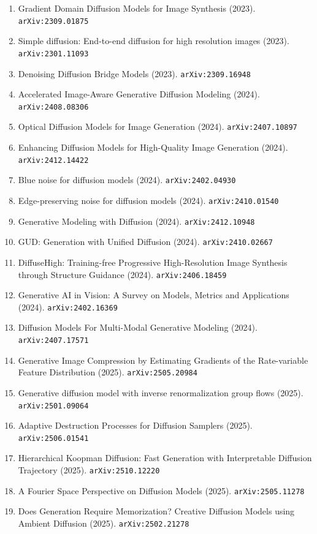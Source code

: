 \documentclass[11pt]{article}
\begin{document}
\begin{enumerate}
  \item Gradient Domain Diffusion Models for Image Synthesis (2023). \texttt{arXiv:2309.01875}
  \item Simple diffusion: End-to-end diffusion for high resolution images (2023). \texttt{arXiv:2301.11093}
  \item Denoising Diffusion Bridge Models (2023). \texttt{arXiv:2309.16948}
  \item Accelerated Image-Aware Generative Diffusion Modeling (2024). \texttt{arXiv:2408.08306}
  \item Optical Diffusion Models for Image Generation (2024). \texttt{arXiv:2407.10897}
  \item Enhancing Diffusion Models for High-Quality Image Generation (2024). \texttt{arXiv:2412.14422}
  \item Blue noise for diffusion models (2024). \texttt{arXiv:2402.04930}
  \item Edge-preserving noise for diffusion models (2024). \texttt{arXiv:2410.01540}
  \item Generative Modeling with Diffusion (2024). \texttt{arXiv:2412.10948}
  \item GUD: Generation with Unified Diffusion (2024). \texttt{arXiv:2410.02667}
  \item DiffuseHigh: Training-free Progressive High-Resolution Image Synthesis
  through Structure Guidance (2024). \texttt{arXiv:2406.18459}
  \item Generative AI in Vision: A Survey on Models, Metrics and Applications (2024). \texttt{arXiv:2402.16369}
  \item Diffusion Models For Multi-Modal Generative Modeling (2024). \texttt{arXiv:2407.17571}
  \item Generative Image Compression by Estimating Gradients of the Rate-variable Feature Distribution (2025). \texttt{arXiv:2505.20984}
  \item Generative diffusion model with inverse renormalization group flows (2025). \texttt{arXiv:2501.09064}
  \item Adaptive Destruction Processes for Diffusion Samplers (2025). \texttt{arXiv:2506.01541}
  \item Hierarchical Koopman Diffusion: Fast Generation with Interpretable Diffusion Trajectory (2025). \texttt{arXiv:2510.12220}
  \item A Fourier Space Perspective on Diffusion Models (2025). \texttt{arXiv:2505.11278}
  \item Does Generation Require Memorization? Creative Diffusion Models using Ambient Diffusion (2025). \texttt{arXiv:2502.21278}

\end{enumerate}
\end{document}
